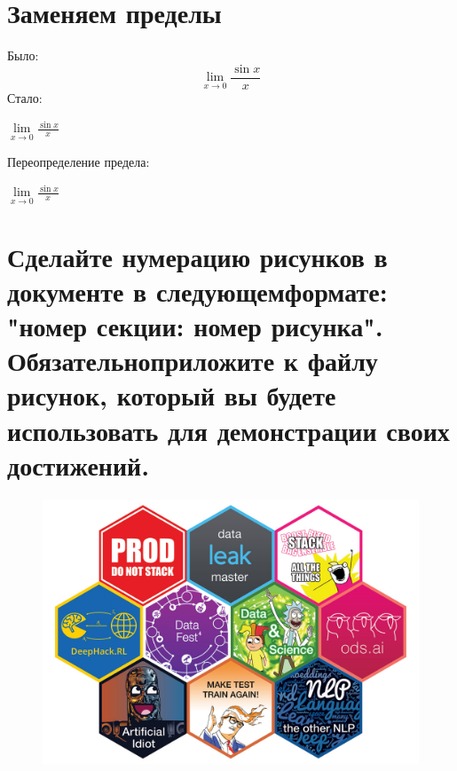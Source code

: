 \documentclass[12pt, a4paper]{article}
\begin{document}
\section{Заменяем пределы}
Было:
\[\lim_{x \to 0} \frac{\sin{x}}{x}  \]
Стало:\\
\def\llim{\begin{center}
\ensuremath{\displaystyle\lim\limits_{x \to 0} \frac{\sin{x}}{x}}
\end{center}}
\llim
Переопределение предела:\\
\renewcommand{\L}{\lim}
\begin{center}{$\displaystyle\L\limits_{x \to 0} \frac{\sin{x}}{x}$}\
\end{center}

\section{Сделайте нумерацию рисунков в документе в следующемформате: "номер секции: номер рисунка". Обязательноприложите к файлу рисунок, который вы будете использовать для демонстрации своих достижений.}
\begin{figure} [H]
\begin{center}
\includegraphics[scale=0.15]{1.jpg} 
\end{center}
\caption{}
\end{figure}
\end{document}
